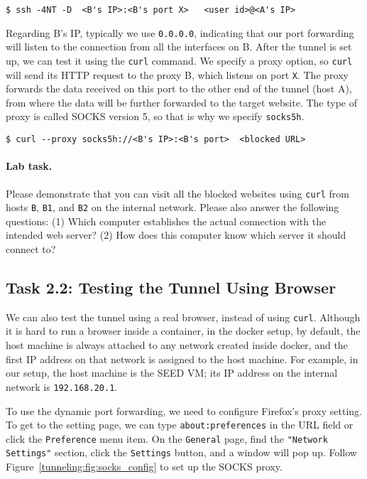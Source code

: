 \begin{lstlisting}
$ ssh -4NT -D  <B's IP>:<B's port X>   <user id>@<A's IP> 
\end{lstlisting}

Regarding B's IP, typically we use \texttt{0.0.0.0}, indicating
that our port forwarding will listen to the connection from 
all the interfaces on B.
After the tunnel is set up, we can test it using the \texttt{curl}
command. We specify a proxy option, so \texttt{curl} will
send its HTTP request to the proxy B, which listens on
port \texttt{X}. The proxy forwards the data received on this
port to the other end of the tunnel (host A), from where
the data will be further forwarded to 
the target website. The type of proxy is called SOCKS version 5, 
so that is why we specify \texttt{socks5h}.  


\begin{lstlisting}
$ curl --proxy socks5h://<B's IP>:<B's port>  <blocked URL>
\end{lstlisting}

\paragraph{Lab task.} Please demonstrate that you can 
visit all the blocked websites using \texttt{curl}
from hosts \texttt{B},
\texttt{B1}, and \texttt{B2} on the internal network. 
Please also answer the following questions:
(1) Which computer establishes the actual connection with the 
intended web server? 
(2) How does this computer know which server it should connect to? 



\subsection{Task 2.2: Testing the Tunnel Using Browser} 

We can also test the tunnel using a real browser, instead of using
\texttt{curl}. Although it is hard to run
a browser inside a container, in the docker setup, by default,
the host machine is always attached to any network created inside docker, and the
first IP address on that network is assigned to the host machine.
For example, in our setup, the host machine is the SEED VM; its IP address
on the internal network \internalnet is \texttt{192.168.20.1}.

To use the dynamic port forwarding, 
we need to configure Firefox's proxy setting. 
To get to the setting page, we can type \texttt{about:preferences} 
in the URL field or click the \texttt{Preference} menu item.
On the \texttt{General} page, find the \texttt{"Network Settings"} section,
click the \texttt{Settings} button, and a window will pop up.
Follow Figure~\ref{tunneling:fig:socks_config} to set up
the SOCKS proxy.

